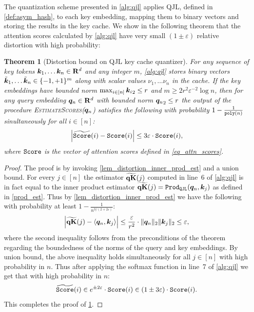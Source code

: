 \documentclass[11pt]{article}
\theoremstyle{plain}
\newtheorem{theorem}{Theorem}[section]
\theoremstyle{definition}
\theoremstyle{remark}
\newcommand{\prodqjl}{\operatorname{{\tt Prod_{QJL}}}}
\let\norm\relax
\newcommand{\norm}[1]{\|#1\|}
\begin{document}
The quantization scheme presented in \cref{alg:qjl} applies QJL, defined in \cref{def:asym_hash}, to each key embedding, mapping them to binary vectors and storing the results in the key cache. 
We show in the following theorem that the attention scores calculated by \cref{alg:qjl} have very small $(1\pm \varepsilon)$ relative distortion with high probability:
\begin{theorem}[Distortion bound on QJL key cache quantizer]\label{thm-distortion}
For any sequence of key tokens ${\bm k}_1, \ldots {\bm k}_n \in {\mathbf{R}}^d$ and any integer $m$, \cref{alg:qjl} stores binary vectors $\Tilde{{\bm k}}_1, \ldots \Tilde{{\bm k}}_n \in \{-1, +1\}^m$ along with scalar values $\nu_1, \ldots \nu_n$ in the cache. If the key embeddings have bounded norm $\max_{i \in [n]} \norm{\k_i}_2 \le r$ and $m \ge 2 r^2\varepsilon^{-2} \log n$, then for any query embedding ${\bm q}_n \in {\mathbf{R}}^d$ with bounded norm $\norm{\q_n}_2 \le r$ the output of the procedure \textsc{EstimateScores}(${\bm q}_n$) satisfies the following with probability $1-\frac{1}{{\tt poly}(n)}$ sinultaneously for all $i \in [n]$:
\[
\left| \widetilde{\tt Score}(i) - {\tt Score}(i) \right| \le 3\varepsilon \cdot {\tt Score}(i),
\]
where ${\tt Score}$ is the vector of attention scores defined in \cref{eq_attn_scores}.
\end{theorem}
\begin{proof}
    The proof is by invoking \cref{lem_distortion_inner_prod_est} and a union bound.
    For every $j \in [n]$ the estimator $\widetilde{{\bf qK}}(j)$ computed in line~6 of \cref{alg:qjl} is in fact equal to the inner product estimator $\widetilde{{\bf qK}}(j) = \prodqjl(\q_n, \k_j)$ as defined in \cref{prod_est}.
    Thus by \cref{lem_distortion_inner_prod_est} we have the following with probability at least $1 - \frac{1}{n^{3/(2+2\varepsilon)}}$:
    \[
    \left| \widetilde{{\bf qK}}(j) - \langle {\bm q}_n, {\bm k}_j \rangle \right| \le \frac{\varepsilon}{r^2} \cdot \|{\bm q}_n\|_2\|{\bm k}_j\|_2 \le \varepsilon,
    \]
    where the second inequality follows from the preconditions of the theorem regarding the boundedness of the norms of the query and key embeddings. 
    By union bound, the above inequality holds simultaneously for all $j \in [n]$ with high probability in $n$. 
    Thus after applying the softmax function in line~7 of \cref{alg:qjl} we get that with high probability in $n$:
    \[
    \widetilde{\tt Score}(i) \in e^{\pm 2 \varepsilon} \cdot {\tt Score}(i) \in (1 \pm 3 \varepsilon) \cdot {\tt Score}(i).
    \]
    This completes the proof of \cref{thm-distortion}.
\end{proof}
\end{document}
